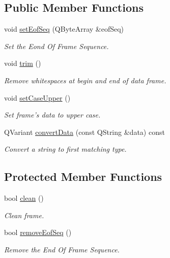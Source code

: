 \subsection*{Public Member Functions}
\begin{DoxyCompactItemize}
\item 
void \hyperlink{classmdt_frame_codec_ascii_a771d983498fb298595afbb97ee7a40f1}{setEofSeq} (QByteArray \&eofSeq)
\begin{DoxyCompactList}\small\item\em Set the Eond Of Frame Sequence. \end{DoxyCompactList}\item 
\hypertarget{classmdt_frame_codec_ascii_a0e8b9664e1451400e1b955c5180c0de8}{
void \hyperlink{classmdt_frame_codec_ascii_a0e8b9664e1451400e1b955c5180c0de8}{trim} ()}
\label{classmdt_frame_codec_ascii_a0e8b9664e1451400e1b955c5180c0de8}

\begin{DoxyCompactList}\small\item\em Remove whitespaces at begin and end of data frame. \end{DoxyCompactList}\item 
\hypertarget{classmdt_frame_codec_ascii_a119506d484a807d3486d47738ee22920}{
void \hyperlink{classmdt_frame_codec_ascii_a119506d484a807d3486d47738ee22920}{setCaseUpper} ()}
\label{classmdt_frame_codec_ascii_a119506d484a807d3486d47738ee22920}

\begin{DoxyCompactList}\small\item\em Set frame's data to upper case. \end{DoxyCompactList}\item 
\hypertarget{classmdt_frame_codec_ascii_aca3ccdf0bc617747e99ed1672344b880}{
QVariant \hyperlink{classmdt_frame_codec_ascii_aca3ccdf0bc617747e99ed1672344b880}{convertData} (const QString \&data) const }
\label{classmdt_frame_codec_ascii_aca3ccdf0bc617747e99ed1672344b880}

\begin{DoxyCompactList}\small\item\em Convert a string to first matching type. \end{DoxyCompactList}\end{DoxyCompactItemize}
\subsection*{Protected Member Functions}
\begin{DoxyCompactItemize}
\item 
bool \hyperlink{classmdt_frame_codec_ascii_a1dc1b7eda5e034c41b27c431227881e1}{clean} ()
\begin{DoxyCompactList}\small\item\em Clean frame. \end{DoxyCompactList}\item 
bool \hyperlink{classmdt_frame_codec_ascii_ab9aebbbadb6d40b1353634154e6a28c0}{removeEofSeq} ()
\begin{DoxyCompactList}\small\item\em Remove the End Of Frame Sequence. \end{DoxyCompactList}\end{DoxyCompactItemize}
